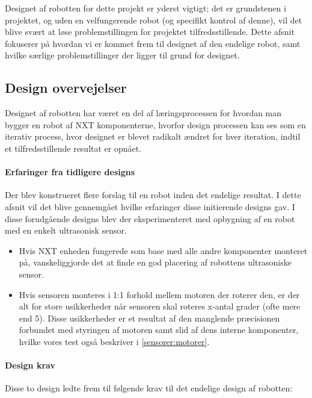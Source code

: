 Designet af robotten for dette projekt er yderst vigtigt; det er grundstenen i projektet, og uden en velfungerende robot (og specifikt kontrol af denne), vil det blive svært at løse problemstillingen for projektet tilfredsstillende.
Dette afsnit fokuserer på hvordan vi er kommet frem til designet af den endelige robot, samt hvilke særlige problemstillinger der ligger til grund for designet.

\subsection{Design overvejelser}\label{robot:design}
Designet af robotten har været en del af læringsprocessen for hvordan man bygger en robot af \lego NXT komponenterne, hvorfor design processen kan ses som en iterativ process, hvor designet er blevet radikalt ændret for hver iteration, indtil et tilfredsstillende resultat er opnået.


\paragraph{Erfaringer fra tidligere designs} 
Der blev konstrueret flere forslag til en robot inden det endelige resultat. 
I dette afsnit vil det blive gennemgået hvilke erfaringer disse initierende designs gav.
I disse forudgående designs blev der eksperimenteret med opbygning af en robot med en enkelt ultrasonisk sensor.

\begin{itemize}
\item Hvis NXT enheden fungerede som base med alle andre komponenter monteret på, vanskeliggjorde det at finde en god placering af robottens ultrasoniske sensor.

\item Hvis sensoren monteres i 1:1 forhold mellem motoren der roterer den, er der alt for store usikkerheder når sensoren skal roteres x-antal grader (ofte mere end 5\degree).
Disse usikkerheder er et resultat af den manglende præcisionen forbundet med styringen af motoren samt slid af dens interne komponenter, hvilke vores test også beskriver i \cref{sensorer:motorer}.
\end{itemize}

\paragraph{Design krav}
Disse to design ledte frem til følgende krav til det endelige design af robotten:

